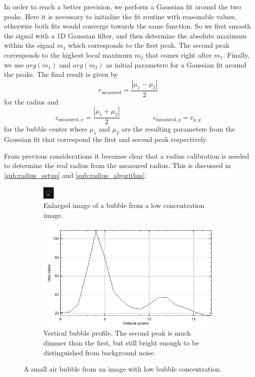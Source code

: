 	In order to reach a better precision, we perform a Gaussian fit around the two peaks. Here it is necessary to initialize the fit routine with reasonable values, otherwise both fits would converge towards the same function. So we first smooth the signal with a 1D Gaussian filter, and then determine the absolute maximum within the signal $m_1$ which corresponds to the first peak. The second peak corresponds to the highest local maximum $m_2$ that comes right after $m_1$. Finally, we use $arg(m_1)$ and $arg(m_2)$ as initial parameters for a Gaussian fit around the peaks. The final result is given by
	\begin{equation}
		r_{\text{measured}} = \dfrac{| \mu_1 - \mu_2 |}{2}
		\label{eq:get_radius}
	\end{equation}
	for the radius and 
	\begin{equation}
		c_{\text{measured},x} = \dfrac{| \mu_1 + \mu_2 |}{2} \hspace{2cm} c_{\text{measured},y} = v_{p,y}
	\end{equation}
	for the bubble center 
	where $\mu_1$ and $\mu_2$ are the resulting parameters from the Gaussian fit that correspond the first and second peak respectively. 
	
	From previous considerations it becomes clear that a radius calibration is needed to determine the real radius from the measured radius. This is discussed in \ref{sub:radius_setup} and \ref{sub:radius_algorithm}.

		
		\begin{figure}
			\begin{subfigure}[t]{.4\textwidth}
				\includegraphics[scale=9]{images/one_peaks.png}
				\caption{Enlarged image of a bubble from a low concentration image. }
			\end{subfigure}
			
			\begin{subfigure}[t]{.5\textwidth}
				\includegraphics[scale=.5]{graphs/one_peaks_profile.png}
				\caption{Vertical bubble profile. The second peak is much dimmer than the first, but still bright enough to be distinguished from background noise.}
			\end{subfigure}
			\caption{A small air bubble from an image with low bubble concentration. }
			\label{fig:bubble_profile}
		\end{figure}
		

